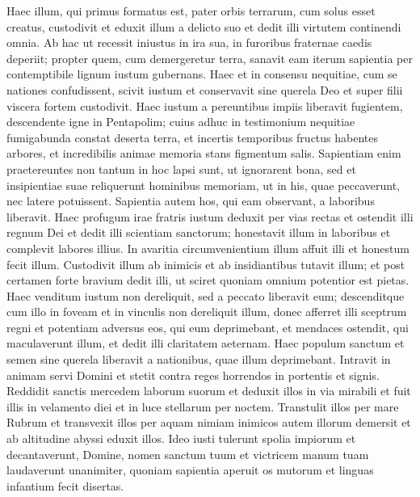 \begin{biblechapter}
\begin{biblechapter}
\begin{biblechapter}
\begin{biblechapter}
\begin{biblechapter}
\begin{biblechapter}
\begin{biblechapter}
\begin{biblechapter}
\begin{biblechapter}
\begin{biblechapter}
\verse Haec illum, qui primus formatus est, pater orbis terrarum,
 cum solus esset creatus, custodivit
 et eduxit illum a delicto suo
 \verse et dedit illi virtutem continendi omnia.
 \verse Ab hac ut recessit iniustus in ira sua,
 in furoribus fraternae caedis deperiit;
 \verse propter quem, cum demergeretur terra,
 sanavit eam iterum sapientia
 per contemptibile lignum iustum gubernans.
 \verse Haec et in consensu nequitiae, cum se nationes confudissent,
 scivit iustum et conservavit sine querela Deo
 et super filii viscera fortem custodivit.
 \verse Haec iustum a pereuntibus impiis liberavit fugientem,
 descendente igne in Pentapolim;
 \verse cuius adhuc in testimonium nequitiae
 fumigabunda constat deserta terra,
 et incertis temporibus fructus habentes arbores,
 et incredibilis animae memoria stans figmentum salis.
 \verse Sapientiam enim praetereuntes
 non tantum in hoc lapsi sunt, ut ignorarent bona,
 sed et insipientiae suae reliquerunt hominibus memoriam,
 ut in his, quae peccaverunt, nec latere potuissent.
 \verse Sapientia autem hos, qui eam observant, a laboribus liberavit.
 \verse Haec profugum irae fratris iustum
 deduxit per vias rectas
 et ostendit illi regnum Dei
 et dedit illi scientiam sanctorum;
 honestavit illum in laboribus
 et complevit labores illius.
 \verse In avaritia circumvenientium illum affuit illi
 et honestum fecit illum.
 \verse Custodivit illum ab inimicis
 et ab insidiantibus tutavit illum;
 et post certamen forte bravium dedit illi,
 ut sciret quoniam omnium potentior est pietas.
 \verse Haec venditum iustum non dereliquit,
 sed a peccato liberavit eum;
 \verse descenditque cum illo in foveam
 et in vinculis non dereliquit illum,
 donec afferret illi sceptrum regni
 et potentiam adversus eos, qui eum deprimebant,
 et mendaces ostendit, qui maculaverunt illum,
 et dedit illi claritatem aeternam.
 \verse Haec populum sanctum et semen sine querela
 liberavit a nationibus, quae illum deprimebant.
 \verse Intravit in animam servi Domini
 et stetit contra reges horrendos in portentis et signis.
 \verse Reddidit sanctis mercedem laborum suorum
 et deduxit illos in via mirabili
 et fuit illis in velamento diei
 et in luce stellarum per noctem.
 \verse Transtulit illos per mare Rubrum
 et transvexit illos per aquam nimiam
 \verse inimicos autem illorum demersit
 et ab altitudine abyssi eduxit illos.
 \verse Ideo iusti tulerunt spolia impiorum
 et decantaverunt, Domine, nomen sanctum tuum
 et victricem manum tuam laudaverunt unanimiter,
 \verse quoniam sapientia aperuit os mutorum
 et linguas infantium fecit disertas.
 

\end{biblechapter}
\end{biblechapter}
\end{biblechapter}
\end{biblechapter}
\end{biblechapter}
\end{biblechapter}
\end{biblechapter}
\end{biblechapter}
\end{biblechapter}
\end{biblechapter}
